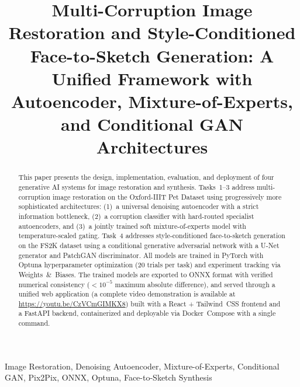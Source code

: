 \documentclass[conference]{IEEEtran}
\begin{document}
\title{Multi-Corruption Image Restoration and Style-Conditioned Face-to-Sketch Generation: A Unified Framework with Autoencoder, Mixture-of-Experts, and Conditional GAN Architectures}

\author{
}

\maketitle

\begin{abstract}
This paper presents the design, implementation, evaluation, and deployment of four generative AI systems for image restoration and synthesis. Tasks~1--3 address multi-corruption image restoration on the Oxford-IIIT Pet Dataset using progressively more sophisticated architectures: (1)~a universal denoising autoencoder with a strict information bottleneck, (2)~a corruption classifier with hard-routed specialist autoencoders, and (3)~a jointly trained soft mixture-of-experts model with temperature-scaled gating. Task~4 addresses style-conditioned face-to-sketch generation on the FS2K dataset using a conditional generative adversarial network with a U-Net generator and PatchGAN discriminator. All models are trained in PyTorch with Optuna hyperparameter optimization (20 trials per task) and experiment tracking via Weights~\&~Biases. The trained models are exported to ONNX format with verified numerical consistency ($< 10^{-5}$ maximum absolute difference), and served through a unified web application (a complete video demonstration is available at \url{https://youtu.be/CzVCmGIMKX8}) built with a React + Tailwind~CSS frontend and a FastAPI backend, containerized and deployable via Docker~Compose with a single command.
\end{abstract}

\begin{IEEEkeywords}
Image Restoration, Denoising Autoencoder, Mixture-of-Experts, Conditional GAN, Pix2Pix, ONNX, Optuna, Face-to-Sketch Synthesis
\end{IEEEkeywords}

\end{document}
